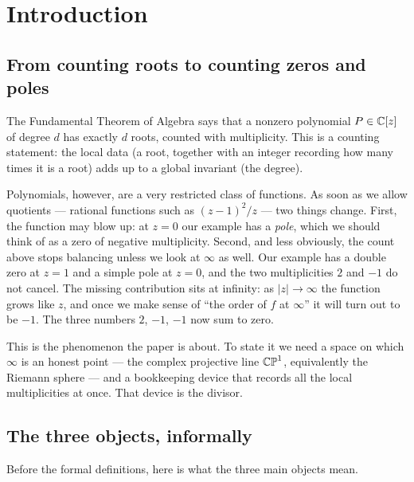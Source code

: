 \section{Introduction}

\subsection{From counting roots to counting zeros and poles}

The Fundamental Theorem of Algebra says that a nonzero polynomial $P \in \mathbb{C}[z]$
of degree $d$ has exactly $d$ roots, counted with multiplicity. This is a
counting statement: the local data (a root, together with an integer recording
how many times it is a root) adds up to a global invariant (the degree).

Polynomials, however, are a very restricted class of functions. As soon as we
allow quotients --- rational functions such as $(z-1)^2/z$ --- two things change.
First, the function may blow up: at $z = 0$ our example has a \emph{pole}, which
we should think of as a zero of negative multiplicity. Second, and less
obviously, the count above stops balancing unless we look at $\infty$ as well.
Our example has a double zero at $z=1$ and a simple pole at $z=0$, and the two
multiplicities $2$ and $-1$ do not cancel. The missing contribution sits at
infinity: as $|z| \to \infty$ the function grows like $z$, and once we make sense
of ``the order of $f$ at $\infty$'' it will turn out to be $-1$. The three
numbers $2$, $-1$, $-1$ now sum to zero.

This is the phenomenon the paper is about. To state it we need a space on which
$\infty$ is an honest point --- the complex projective line $\mathbb{CP}^1$, equivalently
the Riemann sphere --- and a bookkeeping device that records all the local
multiplicities at once. That device is the divisor.

\subsection{The three objects, informally}

Before the formal definitions, here is what the three main objects mean.

